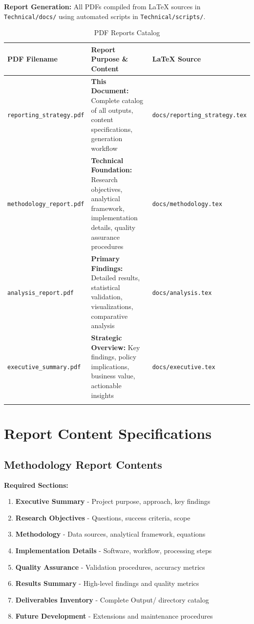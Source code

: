 \documentclass[11pt,letterpaper]{article}
\begin{document}
\textbf{Report Generation:} All PDFs compiled from LaTeX sources in \texttt{Technical/docs/} using automated scripts in \texttt{Technical/scripts/}.

\begin{longtable}{@{}p{4cm}p{7cm}p{3cm}@{}}
\toprule
\textbf{PDF Filename} & \textbf{Report Purpose \& Content} & \textbf{LaTeX Source} \\
\midrule
\endhead
\texttt{reporting\_strategy.pdf} & \textbf{This Document:} Complete catalog of all outputs, content specifications, generation workflow & \texttt{docs/reporting\_strategy.tex} \\
\addlinespace
\texttt{methodology\_report.pdf} & \textbf{Technical Foundation:} Research objectives, analytical framework, implementation details, quality assurance procedures & \texttt{docs/methodology.tex} \\
\addlinespace
\texttt{analysis\_report.pdf} & \textbf{Primary Findings:} Detailed results, statistical validation, visualizations, comparative analysis & \texttt{docs/analysis.tex} \\
\addlinespace
\texttt{executive\_summary.pdf} & \textbf{Strategic Overview:} Key findings, policy implications, business value, actionable insights & \texttt{docs/executive.tex} \\
\bottomrule
\caption{PDF Reports Catalog}
\end{longtable}

\section{Report Content Specifications}

\subsection{Methodology Report Contents}
\textbf{Required Sections:}
\begin{enumerate}
    \item \textbf{Executive Summary} - Project purpose, approach, key findings
    \item \textbf{Research Objectives} - Questions, success criteria, scope
    \item \textbf{Methodology} - Data sources, analytical framework, equations
    \item \textbf{Implementation Details} - Software, workflow, processing steps
    \item \textbf{Quality Assurance} - Validation procedures, accuracy metrics
    \item \textbf{Results Summary} - High-level findings and quality metrics
    \item \textbf{Deliverables Inventory} - Complete Output/ directory catalog
    \item \textbf{Future Development} - Extensions and maintenance procedures
\end{enumerate}
\end{document}
